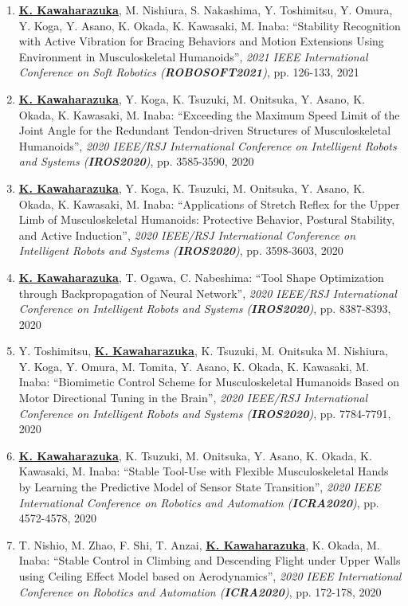 \documentclass[letterpaper,11pt]{article}
\begin{document}
\begin{enumerate}
\item \underline{\textbf{K. Kawaharazuka}}, M. Nishiura, S. Nakashima, Y. Toshimitsu, Y. Omura, Y. Koga, Y. Asano, K. Okada, K. Kawasaki, M. Inaba: ``Stability Recognition with Active Vibration for Bracing Behaviors and Motion Extensions Using Environment in Musculoskeletal Humanoids'', \textit{2021 IEEE International Conference on Soft Robotics (\textit{\textbf{ROBOSOFT2021}})}, pp. 126-133, 2021
\item \underline{\textbf{K. Kawaharazuka}}, Y. Koga, K. Tsuzuki, M. Onitsuka, Y. Asano, K. Okada, K. Kawasaki, M. Inaba: ``Exceeding the Maximum Speed Limit of the Joint Angle for the Redundant Tendon-driven Structures of Musculoskeletal Humanoids'', \textit{2020 IEEE/RSJ International Conference on Intelligent Robots and Systems (\textit{\textbf{IROS2020}})}, pp. 3585-3590, 2020
\item \underline{\textbf{K. Kawaharazuka}}, Y. Koga, K. Tsuzuki, M. Onitsuka, Y. Asano, K. Okada, K. Kawasaki, M. Inaba: ``Applications of Stretch Reflex for the Upper Limb of Musculoskeletal Humanoids: Protective Behavior, Postural Stability, and Active Induction'', \textit{2020 IEEE/RSJ International Conference on Intelligent Robots and Systems (\textit{\textbf{IROS2020}})}, pp. 3598-3603, 2020
\item \underline{\textbf{K. Kawaharazuka}}, T. Ogawa, C. Nabeshima: ``Tool Shape Optimization through Backpropagation of Neural Network'', \textit{2020 IEEE/RSJ International Conference on Intelligent Robots and Systems (\textit{\textbf{IROS2020}})}, pp. 8387-8393, 2020
\item Y. Toshimitsu, \underline{\textbf{K. Kawaharazuka}}, K. Tsuzuki, M. Onitsuka M. Nishiura, Y. Koga, Y. Omura, M. Tomita, Y. Asano, K. Okada, K. Kawasaki, M. Inaba: ``Biomimetic Control Scheme for Musculoskeletal Humanoids Based on Motor Directional Tuning in the Brain'', \textit{2020 IEEE/RSJ International Conference on Intelligent Robots and Systems (\textit{\textbf{IROS2020}})}, pp. 7784-7791, 2020
\item \underline{\textbf{K. Kawaharazuka}}, K. Tsuzuki, M. Onitsuka, Y. Asano, K. Okada, K. Kawasaki, M. Inaba: ``Stable Tool-Use with Flexible Musculoskeletal Hands by Learning the Predictive Model of Sensor State Transition'', \textit{2020 IEEE International Conference on Robotics and Automation (\textit{\textbf{ICRA2020}})}, pp. 4572-4578, 2020
\item T. Nishio, M. Zhao, F. Shi, T. Anzai, \underline{\textbf{K. Kawaharazuka}}, K. Okada, M. Inaba: ``Stable Control in Climbing and Descending Flight under Upper Walls using Ceiling Effect Model based on Aerodynamics'', \textit{2020 IEEE International Conference on Robotics and Automation (\textit{\textbf{ICRA2020}})}, pp. 172-178, 2020

\end{enumerate}
\end{document}
